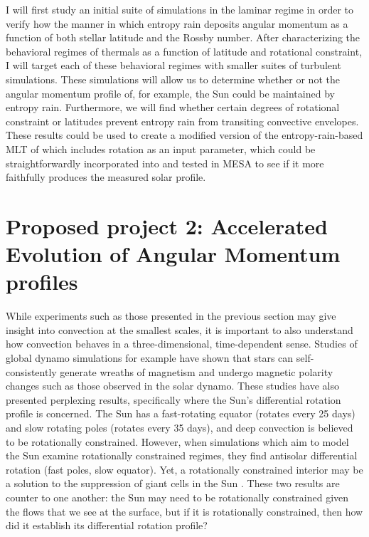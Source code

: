 \documentclass[aasms,12pt]{article}
\begin{document}
I will first study an initial suite of simulations in the laminar regime in order to verify how the manner in which entropy rain deposits angular momentum as a function of both stellar latitude and the Rossby number.
After characterizing the behavioral regimes of thermals as a function of latitude and rotational constraint, I will target each of these behavioral regimes with smaller suites of turbulent simulations.
These simulations will allow us to determine whether or not the angular momentum profile of, for example, the Sun could be maintained by entropy rain.
Furthermore, we will find whether certain degrees of rotational constraint or latitudes prevent entropy rain from transiting convective envelopes.
These results could be used to create a modified version of the entropy-rain-based MLT of \citet{brandenburg2016} which includes rotation as an input parameter, which could be straightforwardly incorporated into and tested in MESA to see if it more faithfully produces the measured solar profile.


\section{Proposed project 2: Accelerated Evolution of Angular Momentum profiles}
\label{sct:global_models}
While experiments such as those presented in the previous section may give insight into convection at the smallest scales, it is important to also understand how convection behaves in a three-dimensional, time-dependent sense.
Studies of global dynamo simulations for example have shown that stars can self-consistently generate wreaths of magnetism and undergo magnetic polarity changes such as those observed in the solar dynamo.
These studies have also presented perplexing results, specifically where the Sun's differential rotation profile is concerned.
The Sun has a fast-rotating equator (rotates every 25 days) and slow rotating poles (rotates every 35 days), and deep convection is believed to be rotationally constrained.
However, when simulations which aim to model the Sun examine rotationally constrained regimes, they find antisolar differential rotation (fast poles, slow equator).
Yet, a rotationally constrained interior may be a solution to the suppression of giant cells in the Sun \citep{featherstone&hindman2016}.
These two results are counter to one another: the Sun may need to be rotationally constrained given the flows that we see at the surface, but if it is rotationally constrained, then how did it establish its differential rotation profile?
\end{document}
